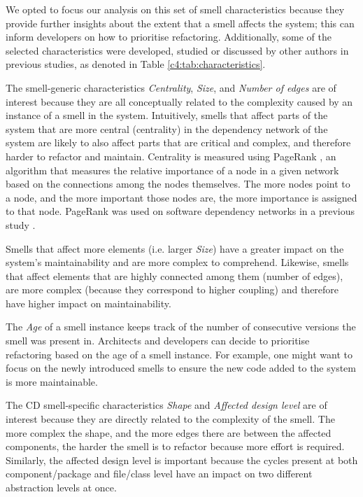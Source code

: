 We opted to focus our analysis on this set of smell characteristics because they provide further insights about the extent that a smell affects the system; this can inform developers on how to prioritise refactoring.
Additionally, some of the selected characteristics were developed, studied or discussed by other authors in previous studies, as denoted in Table \ref{c4:tab:characteristics}.

The smell-generic characteristics \emph{Centrality}, \emph{Size}, and \emph{Number of edges} are of interest because they are all conceptually related to the complexity caused by an instance of a smell in the system. 
Intuitively, smells that affect parts of the system that are more central (centrality) in the dependency network of the system are likely to also affect parts that are critical and complex, and therefore harder to refactor and maintain. 
Centrality is measured using PageRank \cite{Page1999}, an algorithm that measures the relative importance of a node in a given network based on the connections among the nodes themselves. The more nodes point to a node, and the more important those nodes are, the more importance is assigned to that node.
PageRank was used on software dependency networks in a previous study \cite{Roveda2018}.

Smells that affect more elements (i.e. larger \emph{Size}) have a greater impact on the system's maintainability and are more complex to comprehend.
Likewise, smells that affect elements that are highly connected among them (number of edges), are more complex (because they correspond to higher coupling) and therefore have higher impact on maintainability.

The \emph{Age} of a smell instance keeps track of the number of consecutive versions the smell was present in.
Architects and developers can decide to prioritise refactoring based on the age of a smell instance. For example, one might want to focus on the newly introduced smells to ensure the new code added to the system is more maintainable.

The CD smell-specific characteristics \emph{Shape} and \emph{Affected design level} are of interest because they are directly related to the complexity of the smell.
The more complex the shape, and the more edges there are between the affected components, the harder the smell is to refactor because more effort is required.
Similarly, the affected design level is important because the cycles present at both component/package and file/class level have an impact on two different abstraction levels at once.

